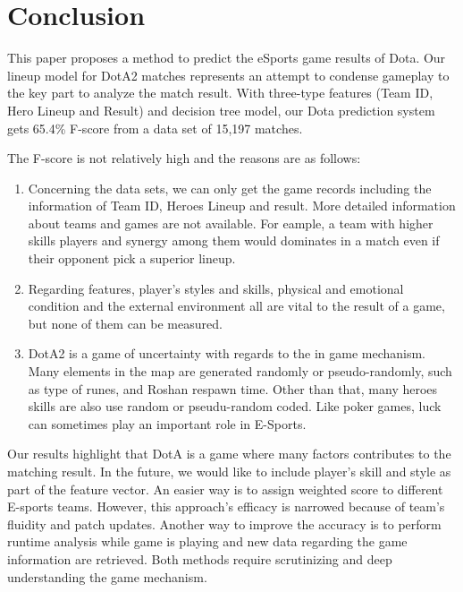 \section{Conclusion}
This paper proposes a method to predict the eSports game results of Dota. Our lineup model for DotA2 matches represents an attempt to condense gameplay to the key part to analyze the match result. 
With three-type features (Team ID, Hero Lineup and Result) and decision tree model, our Dota prediction system gets 65.4\% F-score from a data set of 15,197 matches.
 
The F-score is not relatively high and the reasons are as follows:
\begin{enumerate}
\item Concerning the data sets, we can only get the game records including the information of Team ID, Heroes Lineup and result.
More detailed information about teams and games are not available. For eample, a team with higher skills players and synergy among them would dominates in a match even if their opponent pick a superior lineup.

\item Regarding features, player’s styles and skills, physical and emotional condition and the external environment all are vital to the result of a game, but none of them can be measured.

\item DotA2 is a game of uncertainty with regards to the in game mechanism. Many elements in the map are generated randomly or pseudo-randomly, such as type of runes, and Roshan respawn time. Other than that, many heroes skills are also use random or pseudu-random coded.  Like poker games, luck can sometimes play an important role in E-Sports.

\end{enumerate}
Our results highlight that DotA is a game where many factors contributes to the matching result. In the future, we would like to include player's skill and style as part of the feature vector. An easier way is to assign weighted score to different E-sports teams. However, this approach's efficacy is narrowed because of team's fluidity and patch updates. Another way to improve the accuracy is to perform runtime analysis while game is playing and new data regarding the game information are retrieved. Both methods require scrutinizing and deep understanding the game mechanism.
